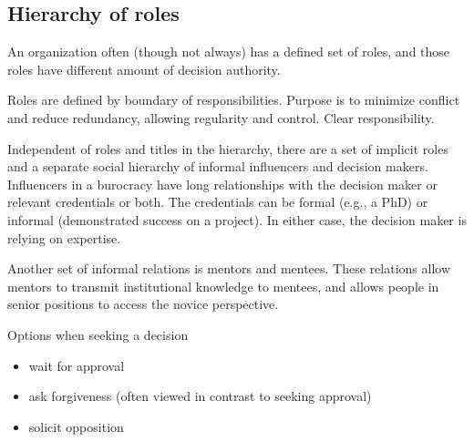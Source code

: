\subsection{Hierarchy of roles}

An \gls{organization} often (though not always) has a defined set of roles, and those roles have different amount of decision authority. 

Roles are defined by boundary of responsibilities. Purpose is to minimize conflict and reduce redundancy, allowing regularity and control. Clear responsibility. 


Independent of roles and titles in the hierarchy, there are a set of implicit roles and a separate social hierarchy of informal influencers and decision makers. Influencers in a burocracy have long relationships with the decision maker or relevant credentials or both. The credentials can be formal (e.g., a PhD) or informal (demonstrated success on a project). In either case, the decision maker is relying on expertise. 

Another set of informal relations is mentors and mentees. These relations allow mentors to transmit institutional knowledge to mentees, and allows people in senior positions to access the novice perspective. 


Options when seeking a decision
\begin{itemize}
    \item wait for approval
    \item ask forgiveness (often viewed in contrast to seeking approval)
    \item solicit opposition
\end{itemize}
